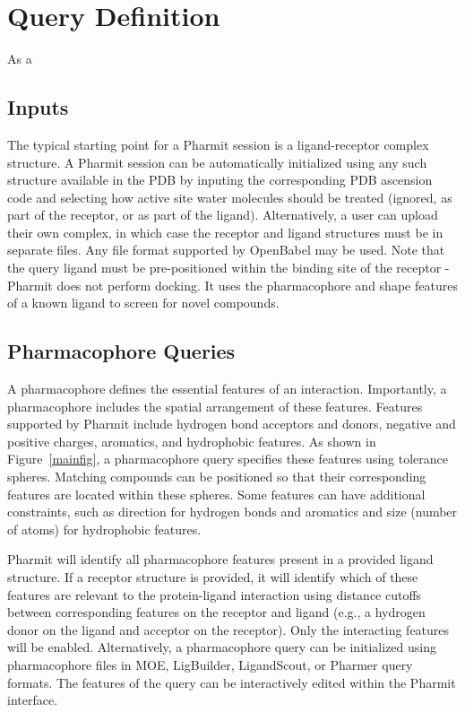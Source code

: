 \section{Query Definition}

As a 

\subsection{Inputs}

The typical starting point for a Pharmit session is a ligand-receptor complex structure. A Pharmit session can be automatically initialized using any such structure available in the PDB by inputing the corresponding PDB ascension code and selecting how active site water molecules should be treated (ignored, as part of the receptor, or as part of the ligand).  Alternatively, a user can upload their own complex, in which case the receptor and ligand structures must be in separate files. Any file format supported by OpenBabel \cite{O_Boyle_2011} may be used.  Note that the query ligand must be pre-positioned within the binding site of the receptor - Pharmit does not perform docking. It uses the pharmacophore and shape features of a known ligand to screen for novel compounds.

\subsection{Pharmacophore Queries}
A pharmacophore \cite{Koes_2015rev,Yang_2010,Leach_2010} defines the essential features of an interaction. Importantly, a pharmacophore includes the spatial arrangement of these features. 
Features supported by Pharmit include hydrogen bond acceptors and donors,  negative and positive charges, aromatics, and hydrophobic features.
As shown in Figure~\ref{mainfig}, a pharmacophore query specifies these features using tolerance spheres. Matching compounds can be positioned so that their corresponding features are located within these spheres. Some features can have additional constraints, such as direction for hydrogen bonds and aromatics and size (number of atoms) for hydrophobic features.

Pharmit will identify all pharmacophore features present in a provided ligand structure. If a receptor structure is provided, it will identify which of these features are relevant to the protein-ligand interaction using distance cutoffs between corresponding features on the receptor and ligand (e.g., a hydrogen donor on the ligand and acceptor on the receptor). Only the interacting features will be enabled. Alternatively, a pharmacophore query can be initialized using pharmacophore files in MOE, LigBuilder, LigandScout, or Pharmer query formats.  The features of the query can be interactively edited within the Pharmit interface.


